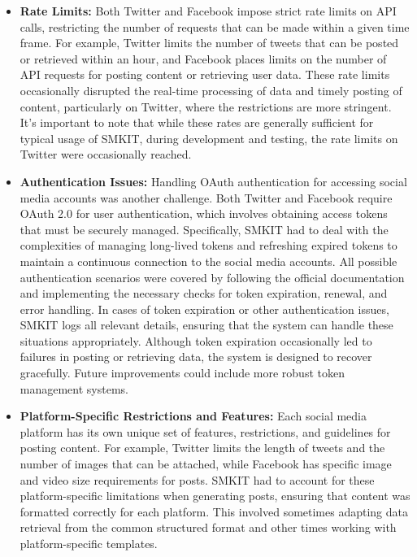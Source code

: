 \begin{itemize}
    \item \textbf{Rate Limits:} Both Twitter and Facebook impose strict rate limits on API calls, restricting the number of requests that can be made within a given time frame. For example, Twitter limits the number of tweets that can be posted or retrieved within an hour, and Facebook places limits on the number of API requests for posting content or retrieving user data. These rate limits occasionally disrupted the real-time processing of data and timely posting of content, particularly on Twitter, where the restrictions are more stringent. It's important to note that while these rates are generally sufficient for typical usage of SMKIT, during development and testing, the rate limits on Twitter were occasionally reached.

    \item \textbf{Authentication Issues:} Handling OAuth authentication for accessing social media accounts was another challenge. Both Twitter and Facebook require OAuth 2.0 for user authentication, which involves obtaining access tokens that must be securely managed. Specifically, SMKIT had to deal with the complexities of managing long-lived tokens and refreshing expired tokens to maintain a continuous connection to the social media accounts. All possible authentication scenarios were covered by following the official documentation and implementing the necessary checks for token expiration, renewal, and error handling. In cases of token expiration or other authentication issues, SMKIT logs all relevant details, ensuring that the system can handle these situations appropriately. Although token expiration occasionally led to failures in posting or retrieving data, the system is designed to recover gracefully. Future improvements could include more robust token management systems.

    \item \textbf{Platform-Specific Restrictions and Features:} Each social media platform has its own unique set of features, restrictions, and guidelines for posting content. For example, Twitter limits the length of tweets and the number of images that can be attached, while Facebook has specific image and video size requirements for posts. SMKIT had to account for these platform-specific limitations when generating posts, ensuring that content was formatted correctly for each platform. This involved sometimes adapting data retrieval from the common structured format and other times working with platform-specific templates.

\end{itemize}

